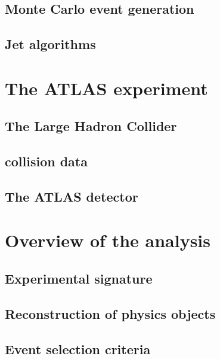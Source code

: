 \documentclass[hyper,linkcolor=blue]{mythesis}
\begin{document}
\begin{mainmatter}
    \section{Monte Carlo event generation}
      \label{sec:mc}
      
    \section{Jet algorithms}
      \label{sec:jets}
      

  \chapter{The ATLAS experiment}
    \label{chap:experiment}
    
    \section{The Large Hadron Collider}
      \label{sec:lhc}
      
    \section{\pp collision data}
      \label{sec:dataset}
      
    \section{The ATLAS detector}
      \label{sec:atlas}
      
  
  \chapter{Overview of the \HWW analysis}
    \label{chap:selection}
    
    \section{Experimental signature}
      \label{sec:signature}
      
    \section{Reconstruction of physics objects}
      \label{sec:objects}
      
    \section{Event selection criteria}
      \label{sec:selection}
      


\end{mainmatter}
\end{document}
